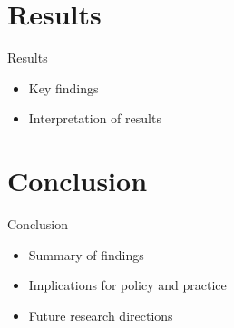 \documentclass{beamer}
\begin{document}
\section{Results}
\begin{frame}{Results}
  \begin{itemize}
    \item Key findings
    \item Interpretation of results
  \end{itemize}
\end{frame}

\section{Conclusion}
\begin{frame}{Conclusion}
  \begin{itemize}
    \item Summary of findings
    \item Implications for policy and practice
    \item Future research directions
  \end{itemize}
\end{frame}

\end{document}
